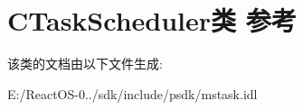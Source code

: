 \hypertarget{class_c_task_scheduler}{}\section{C\+Task\+Scheduler类 参考}
\label{class_c_task_scheduler}


该类的文档由以下文件生成\+:\begin{DoxyCompactItemize}
\item 
E\+:/\+React\+O\+S-\/0../sdk/include/psdk/mstask.\+idl\end{DoxyCompactItemize}
